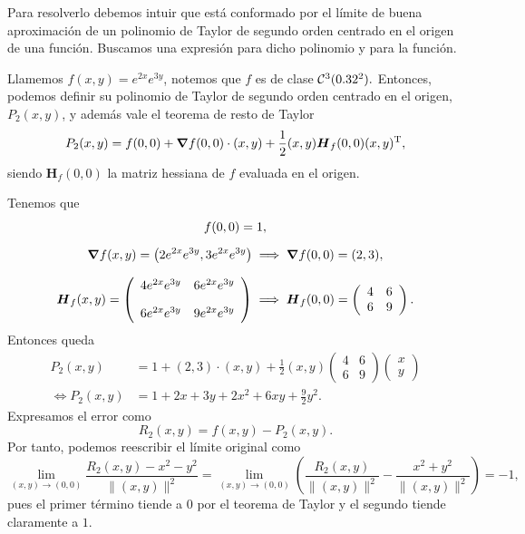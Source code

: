 
\begin{solution}
    Para resolverlo debemos intuir que está conformado por el límite de buena aproximación de un polinomio de Taylor de segundo orden centrado en el origen de una función. Buscamos una expresión para dicho polinomio y para la función.

    Llamemos $f(x,y) = e^{2x}e^{3y}$, notemos que $f$ es de clase $\mathcal{C}^3(0.32^2).$  Entonces, podemos definir su polinomio de Taylor de segundo orden centrado en el origen, $ P_2(x,y)$, y adem\'as vale el teorema de resto de Taylor
    \[
        P_2(x,y) = f(0,0) + \grad f(0,0)\cdot(x,y) + \frac{1}{2}(x,y)\boldsymbol{H}_f(0,0)(x,y)^\mathrm{T},
    \]
    siendo $\boldsymbol{H}_f(0,0)$ la matriz hessiana de $f$ evaluada en el origen.

    Tenemos que
    \begin{gather*}
        f(0,0) = 1,\\[.2cm]
        \grad f(x,y) = \left(2e^{2x}e^{3y}, 3e^{2x}e^{3y}\right) \implies \grad f(0,0) = (2,3),\\[.25cm]
        \boldsymbol{H}_f(x,y) = \left(\begin{array}{cc}
                4e^{2x}e^{3y} & 6e^{2x}e^{3y} \\[10pt]
                6e^{2x}e^{3y} & 9e^{2x}e^{3y}
            \end{array}\right) \implies \boldsymbol{H}_f(0,0) = \left(\begin{array}{cc}
                4 & 6 \\
                6 & 9
            \end{array}\right).
    \end{gather*}
    Entonces queda
    \[
        \begin{aligned}
            P_2(x,y)      & = 1+(2,3)\cdot(x,y)+\frac{1}{2}(x,y)
            \left(\begin{array}{cc}  
                    4 & 6 \\
                    6 & 9
                \end{array}\right)
            \left(\begin{array}{cc}
                          x \\
                          y
                      \end{array}\right)                                                     \\[4pt]
            \iff P_2(x,y) & = 1 + 2x + 3y + 2x^2 + 6xy + \frac{9}{2}y^2.
        \end{aligned}
    \]
    Expresamos el error como
    \[
        R_2(x,y) = f(x,y) - P_2(x,y).
    \]
    Por tanto, podemos reescribir el límite original como
\[
    \lim_{(x,y) \to (0,0)} \frac{R_2(x,y) - x^2 - y^2}{\|(x,y)\|^2} =
    \lim_{(x,y) \to (0,0)} \left( \frac{R_2(x,y)}{\|(x,y)\|^2} - \frac{x^2+y^2}{\|(x,y)\|^2} \right) = -1,
\]
    pues el primer término tiende a 0 por el teorema de Taylor  y el segundo  tiende claramente a $1.$
\end{solution}

